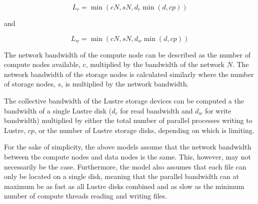     \begin{equation} %
        L_{r} = \min{(cN, sN, d_{r}\min{(d, cp)})}
    \end{equation}

    and


    \begin{equation}%
        L_{w} = \min{(cN, sN, d_{w}\min{(d, cp)})}
    \end{equation}

    The network bandwidth of the compute node can be described as the number of compute 
    nodes available, $c$, multiplied by the bandwidth of the network $N$. The network bandwidth 
    of the storage nodes is calculated similarly where the number of storage nodes, $s$, is
    multiplied by the network bandwidth. 

    The collective bandwidth of the Lustre storage devices can be computed a the bandwidth of a
    single Lustre disk ($d_{r}$ for read bandwidth and $d_{w}$ for write bandwidth) multiplied by 
    either the total number of parallel processes writing to Lustre, $cp$, or the number of Lustre 
    storage disks, depending on which is limiting.



      For the sake of simplicity, the above models assume that the network
      bandwidth between the compute nodes and data nodes is the same. This,
      however, may not necessarily be the case. Furthermore, the model also
      assumes that each file can only be located on a single disk, meaning that
      the parallel bandwidth can at maximum be as fast as all Lustre disks combined and
      as slow as the minimum number of compute threads reading and writing
      files.

